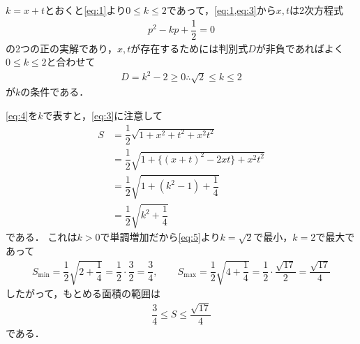 \documentclass[../../main.tex]{subfiles}
\begin{document}
$k=x+t$とおくと\cref{eq:1}より$0\le k\le 2$であって，\cref{eq:1,eq:3}から$x,t$は2次方程式
\begin{align}
  p^2-kp+\dfrac{1}{2}=0
\end{align}
の2つの正の実解であり，$x,t$が存在するためには判別式$D$が非負であればよく$0\le k\le 2$と合わせて
\begin{align}
  D = k^2 -2 \ge 0 \therefore \sqrt{2}\le k\le 2 \label{eq:5}
\end{align}
が$k$の条件である．

\cref{eq:4}を$k$で表すと，\cref{eq:3}に注意して
\begin{align}
  S
  &=\dfrac{1}{2}\sqrt{1+x^2+t^2+x^2t^2} \\
  &=\dfrac{1}{2}\sqrt{1+\{(x+t)^2-2xt\}+x^2t^2} \\
  &=\dfrac{1}{2}\sqrt{1+(k^2-1)+\dfrac{1}{4}} \\
  &=\dfrac{1}{2}\sqrt{k^2+\dfrac{1}{4}}
\end{align}
である．
これは$k>0$で単調増加だから\cref{eq:5}より$k=\sqrt{2}$で最小，$k=2$で最大であって
\begin{align}
  S_{\min}=\dfrac{1}{2}\sqrt{2+\dfrac{1}{4}}=\dfrac{1}{2}\cdot\dfrac{3}{2}=\dfrac{3}{4},\qquad
  S_{\max}=\dfrac{1}{2}\sqrt{4+\dfrac{1}{4}}=\dfrac{1}{2}\cdot\dfrac{\sqrt{17}}{2}=\dfrac{\sqrt{17}}{4}
\end{align}
したがって，もとめる面積の範囲は
\begin{align}
  \dfrac{3}{4}\le S\le\dfrac{\sqrt{17}}{4}
\end{align}
である．

\newpage
\end{document}
